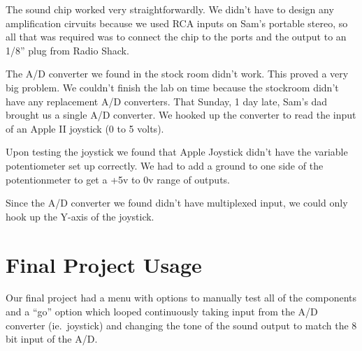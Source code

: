 The sound chip worked very straightforwardly.  We didn't have to design any amplification cirvuits
because we used RCA inputs on Sam's portable stereo, so all that was required was to connect the
chip to the ports and the output to an 1/8'' plug from Radio Shack.

The A/D converter we found in the stock room didn't work.  This proved a very big problem.  We 
couldn't finish the lab on time because the stockroom didn't have any replacement A/D converters.
That Sunday, 1 day late, Sam's dad brought us a single A/D converter.  We hooked up the converter
to read the input of an Apple II joystick (0 to 5 volts).

Upon testing the joystick we found that Apple Joystick didn't have the variable potentiometer
set up correctly.  We had to add a ground to one side of the potentionmeter to get a +5v to 0v
range of outputs. 

Since the A/D converter we found didn't have multiplexed input, we could only hook up the Y-axis
of the joystick.

\section{Final Project Usage}

Our final project had a menu with options to manually test all of the components and a ``go'' option
which looped continuously taking input from the A/D converter (ie.\ joystick) and changing the tone
of the sound output to match the 8 bit input of the A/D.









